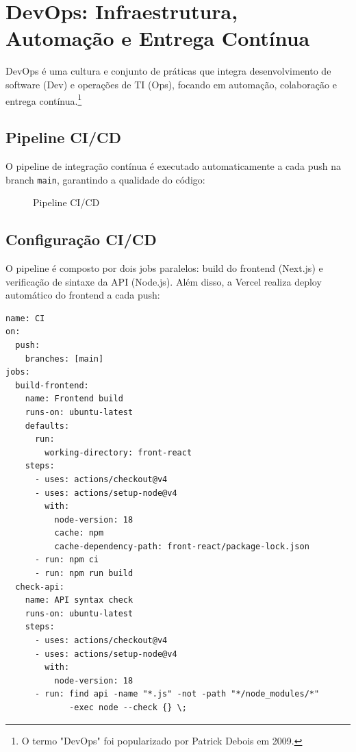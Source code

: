 \documentclass[11pt,a4paper]{article}
\begin{document}
\section{DevOps: Infraestrutura, Automação e Entrega Contínua}
DevOps \cite{kim2018} é uma cultura e conjunto de práticas que integra desenvolvimento de software (Dev) e operações de TI (Ops), focando em automação, colaboração e entrega contínua.\footnote{O termo "DevOps" foi popularizado por Patrick Debois em 2009.}

\subsection{Pipeline CI/CD}
O pipeline de integração contínua é executado automaticamente a cada push na branch \texttt{main}, garantindo a qualidade do código:
\begin{figure}[H]
\centering
{}
\caption{Pipeline CI/CD}
\label{fig:cicd}
\end{figure}

\subsection{Configuração CI/CD}
O pipeline é composto por dois jobs paralelos: build do frontend (Next.js) e verificação de sintaxe da API (Node.js). Além disso, a Vercel realiza deploy automático do frontend a cada push:
\begin{verbatim}
name: CI
on:
  push:
    branches: [main]
jobs:
  build-frontend:
    name: Frontend build
    runs-on: ubuntu-latest
    defaults:
      run:
        working-directory: front-react
    steps:
      - uses: actions/checkout@v4
      - uses: actions/setup-node@v4
        with:
          node-version: 18
          cache: npm
          cache-dependency-path: front-react/package-lock.json
      - run: npm ci
      - run: npm run build
  check-api:
    name: API syntax check
    runs-on: ubuntu-latest
    steps:
      - uses: actions/checkout@v4
      - uses: actions/setup-node@v4
        with:
          node-version: 18
      - run: find api -name "*.js" -not -path "*/node_modules/*"
             -exec node --check {} \;
\end{verbatim}
\end{document}
